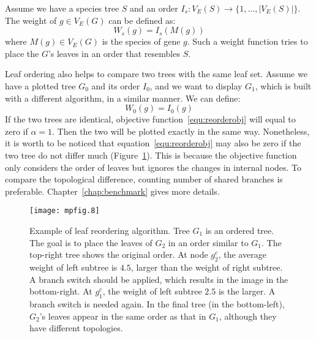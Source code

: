 Assume we have a species tree $S$ and an order $I_s:V_E(S)\rightarrow\{1,\ldots,|V_E(S)|\}$.
The weight of $g\in V_E(G)$ can be defined as:
\begin{equation}
W_s(g) = I_s(M(g))
\end{equation}
where $M(g)\in V_E(G)$ is the species of gene $g$. Such a weight function tries to
place the $G$'s leaves in an order that resembles $S$.

Leaf ordering also helps to compare two trees with the same leaf set. 
Assume we have a plotted tree $G_0$ and its order $I_0$, and we want to display
$G_1$, which is built with a different algorithm, in a similar manner. We can define:
\begin{equation}
W_0(g) = I_0(g)
\end{equation}
If the two trees are identical, objective function~\ref{equ:reorderobj} will equal to
zero if $\alpha=1$. Then the two will be plotted exactly in the same way. Nonetheless, it is worth to be noticed that
equation~\ref{equ:reorderobj} may also be zero if the two tree do not differ much (Figure~\ref{fig:reorder-exa}).
This is because the objective function only considers the order of leaves but ignores
the changes in internal nodes. To compare the topological difference,
counting number of shared branches is preferable. Chapter~\ref{chap:benchmark} gives more details.

\begin{figure}[!hb]
\begin{center}
\texttt{[image: mpfig.8]}
\caption[Example of leaf reordering algorithm]{Example of leaf reordering algorithm.
	Tree $G_1$ is an ordered tree. The goal is to place the leaves of $G_2$ in an order
	similar to $G_1$. The top-right tree shows the original order.
	At node $g_2^c$, the average weight of left subtree is $4.5$,
	larger than the weight of right subtree. A branch switch should be
	applied, which results in the image in the bottom-right.
	At $g_1^c$, the weight of left subtree $2.5$ is the larger. A branch
	switch is needed again. In the final tree (in the bottom-left),
	$G_2$'s leaves appear in the same order as that in $G_1$, although they have different topologies.}\label{fig:reorder-exa}
\end{center}
\end{figure}
